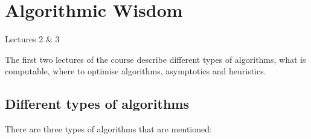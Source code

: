 
\section{Algorithmic Wisdom}

{\hspace{2.2em} \small Lectures 2 \& 3}

The first two lectures of the course describe different types of algorithms,
what is computable, where to optimise algorithms, asymptotics and heuristics.

\subsection{Different types of algorithms}

There are three types of algorithms that are mentioned:


